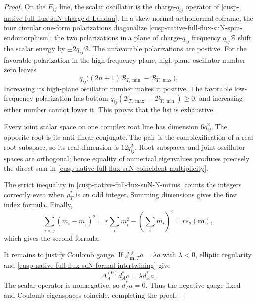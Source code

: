 \begin{proof}
On the \(E_{ij}\) line, the scalar oscillator is the charge-\(q_{ij}\)
operator of \cref{cusp-native-full-flux-suN-charge-d-Landau}.  In a
skew-normal orthonormal coframe, the four circular one-form polarizations
diagonalize \cref{cusp-native-full-flux-suN-spin-endomorphism}; the two
polarizations in a plane of charge-\(q_{ij}\) frequency
\(q_{ij}\mathcal B\) shift the scalar energy by
\(\pm2q_{ij}\mathcal B\).  The unfavorable polarizations are positive.
For the favorable polarization in the high-frequency plane, high-plane
oscillator number zero leaves
\[
 q_{ij}\bigl((2n+1)\mathcal B_{T,\min}
             -\mathcal B_{T,\max}\bigr).
\]
Increasing its high-plane oscillator number makes it positive.  The
favorable low-frequency polarization has bottom
\(q_{ij}(\mathcal B_{T,\max}-\mathcal B_{T,\min})\ge0\), and increasing
either number cannot lower it.  This proves that the list is exhaustive.

Every joint scalar space on one complex root line has dimension
\(6q_{ij}^2\).  The opposite root is its anti-linear conjugate.  The pair is
the complexification of a real root subspace, so its real dimension is
\(12q_{ij}^2\).  Root subspaces and joint oscillator spaces are orthogonal;
hence equality of numerical eigenvalues produces precisely the direct sum
in \cref{cusp-native-full-flux-suN-coincident-multiplicity}.

The strict inequality in
\cref{cusp-native-full-flux-suN-N-minus} counts the integers correctly even
when \(\rho_T^*\) is an odd integer.  Summing dimensions gives the first
index formula.  Finally,
\[
 \sum_{i<j}(m_i-m_j)^2
 =r\sum_i m_i^2-\left(\sum_i m_i\right)^2
 =rs_2(\mathbf m),
\]
which gives the second formula.

It remains to justify Coulomb gauge.  If
\(\mathcal J_{\mathbf m,T}^{\mathrm{gf}}a=\lambda a\) with
\(\lambda<0\), elliptic regularity and
\cref{cusp-native-full-flux-suN-formal-intertwining} give
\[
 \Delta_A^{(0)}d_A^*a=\lambda d_A^*a.
\]
The scalar operator is nonnegative, so \(d_A^*a=0\).  Thus the negative
gauge-fixed and Coulomb eigenspaces coincide, completing the proof.
\end{proof}

